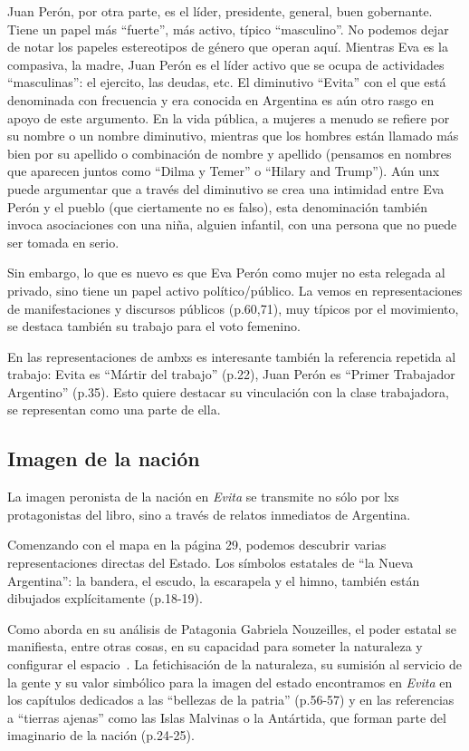 \documentclass[
10pt, %
a4paper, %
oneside, %
headinclude,footinclude, %
]{scrartcl}
\begin{document}
Juan Perón, por otra parte, es el líder, presidente, general, buen gobernante.
Tiene un papel más ``fuerte'', más activo, típico ``masculino''.
No podemos dejar de notar los papeles estereotipos de género que operan aquí.
Mientras Eva es la compasiva, la madre, Juan Perón es el líder activo que se ocupa de actividades ``masculinas'': el ejercito, las deudas, etc.
El diminutivo ``Evita'' con el que está denominada con frecuencia y era conocida en Argentina es aún otro rasgo en apoyo de este argumento.
En la vida pública, a mujeres a menudo se refiere por su nombre o un nombre diminutivo, mientras que los hombres están llamado más bien por su apellido o combinación de nombre y apellido (pensamos en nombres que aparecen juntos como ``Dilma y Temer'' o ``Hilary and Trump'').
Aún unx puede argumentar que a través del diminutivo se crea una intimidad entre Eva Perón y el pueblo (que ciertamente no es falso),
esta denominación también invoca asociaciones con una niña, alguien infantil, con una persona que no puede ser tomada en serio.

Sin embargo, lo que es nuevo es que Eva Perón como mujer no esta relegada al privado, sino tiene un papel activo político/público.
La vemos en representaciones de manifestaciones y discursos públicos (p.60,71), muy típicos por el movimiento, se destaca también su trabajo para el voto femenino.

En las representaciones de ambxs es interesante también la referencia repetida al trabajo:
Evita es ``Mártir del trabajo'' (p.22),
Juan Perón es ``Primer Trabajador Argentino'' (p.35).
Esto quiere destacar su vinculación con la clase trabajadora, se representan como una parte de ella.


\subsection{Imagen de la nación}

La imagen peronista de la nación en \textit{Evita} se transmite no sólo por lxs protagonistas del libro, sino a través de relatos inmediatos de Argentina.

Comenzando con el mapa en la página 29, podemos descubrir varias representaciones directas del Estado.
Los símbolos estatales de ``la Nueva Argentina'': la bandera, el escudo, la escarapela y el himno, también están dibujados explícitamente (p.18-19).

Como aborda en su análisis de Patagonia Gabriela Nouzeilles, el poder estatal se manifiesta, entre otras cosas, en su capacidad para someter la naturaleza y configurar el espacio~\autocite{Nou1999}.
La fetichisación de la naturaleza, su sumisión al servicio de la gente y su valor simbólico para la imagen del estado encontramos en \textit{Evita} en los capítulos dedicados a las ``bellezas de la patria'' (p.56-57) y en las referencias a ``tierras ajenas'' como las Islas Malvinas o la Antártida, que forman parte del imaginario de la nación (p.24-25).
\end{document}

